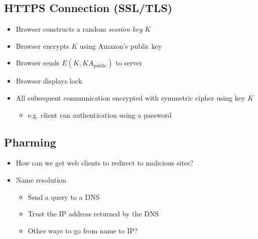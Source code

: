 \subsection{HTTPS Connection (SSL/TLS)}
\begin{itemize}[nosep]
    \item Browser constructs a random \emph{session key} $K$
    \item Browser encrypts $K$ using Amazon's public key
    \item Browser sends $E(K, KA_{\text{public}})$ to server
    \item Browser displays lock
    \item All subsequent communication encrypted with symmetric cipher using key $K$
          \begin{itemize}[nosep]
              \item e.g. client can authentication using a password
          \end{itemize}
\end{itemize}

\subsection{Pharming}
\begin{itemize}[nosep]
    \item How can we get web clients to redirect to malicious sites?
    \item Name resolution
          \begin{itemize}[nosep]
              \item Send a query to a DNS
              \item Trust the IP address returned by the DNS
              \item Other ways to go from name to IP?
          \end{itemize}
\end{itemize}
